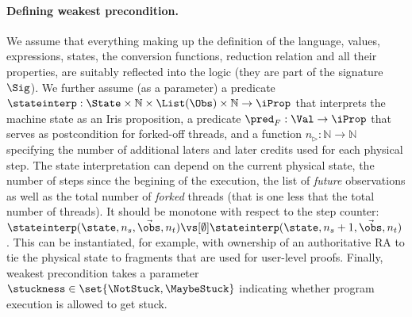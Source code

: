 \paragraph{Defining weakest precondition.}
We assume that everything making up the definition of the language, \ie values, expressions, states, the conversion functions, reduction relation and all their properties, are suitably reflected into the logic (\ie they are part of the signature $\Sig$).
We further assume (as a parameter) a predicate $\stateinterp : \State \times \mathbb N \times \List(\Obs) \times \mathbb N \to \iProp$ that interprets the machine state as an Iris proposition, a predicate $\pred_F: \Val \to \iProp$ that serves as postcondition for forked-off threads, and a function $n_\rhd: \mathbb N \to \mathbb N$ specifying the number of additional laters and later credits used for each physical step.
The state interpretation can depend on the current physical state, the number of steps since the begining of the execution, the list of \emph{future} observations as well as the total number of \emph{forked} threads (that is one less that the total number of threads).
It should be monotone with respect to the step counter: $\stateinterp(\state, n_s, \vec\obs, n_t) \vs[\emptyset] \stateinterp(\state, n_s + 1, \vec\obs, n_t)$.
This can be instantiated, for example, with ownership of an authoritative RA to tie the physical state to fragments that are used for user-level proofs.
Finally, weakest precondition takes a parameter $\stuckness \in \set{\NotStuck, \MaybeStuck}$ indicating whether program execution is allowed to get stuck.

